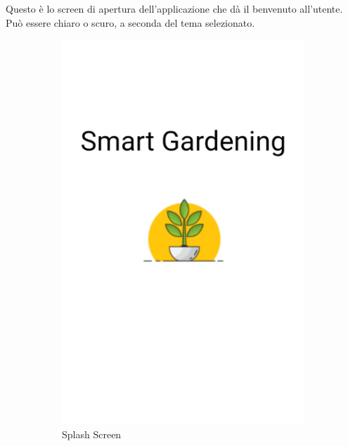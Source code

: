 \documentclass[a4paper,12pt]{report}
\begin{document}
\textsf{\small Questo è lo screen di apertura dell'applicazione che dà il benvenuto all'utente.}
\textsf{\small Può essere chiaro o scuro, a seconda del tema selezionato.}

\begin{figure}[H]

\begin{subfigure}{0.3\textwidth}
	\includegraphics[width=\textwidth]{./images/splash/splash_screen.png}
	\caption{Splash Screen}
	\label{fig:splash_screen}
\end{subfigure}
\hfill
\begin{subfigure}{0.3\textwidth}

\end{subfigure}
\end{figure}
\end{document}
